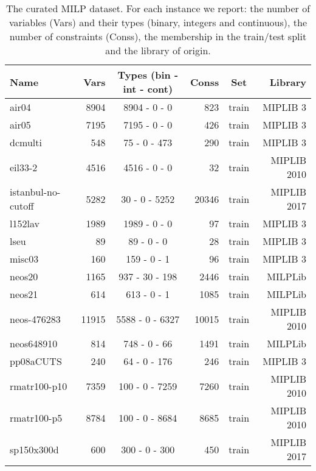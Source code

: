 \documentclass[letterpaper]{article} %
\begin{document}
\begin{table*}[t]
    \caption{The curated MILP dataset. For each instance we report: the number of variables (Vars) and their types (binary, integers and continuous), the number of constraints (Conss), the membership in the train/test split and the library of origin.}
    \label{tab:milp_instances}
    \centering
    \begin{footnotesize}
    \begin{tabular}{lrcrcr}
\toprule
           Name         & Vars  &  Types (bin - int - cont)  & Conss &  Set & Library  \\
\toprule
    air04               & 8904  & 8904 - 0 - 0      & 823   & train & MIPLIB 3 \\
    air05               & 7195  & 7195 - 0 - 0      & 426   & train & MIPLIB 3\\
    dcmulti             & 548   & 75  - 0  - 473    & 290   & train & MIPLIB 3\\
    eil33-2             & 4516  & 4516 - 0 - 0      & 32    & train & MIPLIB 2010 \\
    istanbul-no-cutoff  & 5282  & 30 - 0 - 5252     & 20346 & train & MIPLIB 2017 \\
    l152lav             & 1989  & 1989 - 0 - 0      & 97    & train & MIPLIB 3 \\
    lseu                & 89    & 89  - 0  - 0      & 28    & train & MIPLIB 3 \\
    misc03              & 160   & 159  - 0 - 1      & 96    & train & MIPLIB 3 \\
    neos20              & 1165  & 937  - 30 - 198  & 2446  & train & MILPLib \\
    neos21              & 614   & 613 - 0 - 1       & 1085  & train & MILPLib \\
    neos-476283         & 11915 & 5588 - 0 - 6327   & 10015 & train & MIPLIB 2010 \\
    neos648910          & 814   & 748  - 0  - 66    & 1491  & train & MILPLib \\
    pp08aCUTS           & 240   & 64  - 0  - 176    & 246   & train & MIPLIB 3 \\
    rmatr100-p10        & 7359  & 100 - 0 - 7259    & 7260  & train & MIPLIB 2010 \\
    rmatr100-p5         & 8784  & 100 - 0 - 8684    & 8685  & train & MIPLIB 2010 \\
    sp150x300d          & 600   & 300 - 0 - 300     & 450   & train & MIPLIB 2017 \\

\end{tabular}
\end{footnotesize}
\end{table*}
\end{document}
